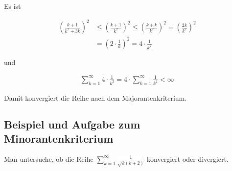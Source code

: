 \documentclass[fontsize=9pt,
               parskip=half-,
               DIV=14,
               listof=chapterentry,
               tocflat]{scrbook}
\begin{document}
\begin{solution*}[Majorantenkriterium]
Es ist

\begin{align*}
\left({\frac {k+1}{k^{2}+3k}}\right)^{2}&\leq \left({\frac {k+1}{k^{2}}}\right)^{2}\leq \left({\frac {k+k}{k^{2}}}\right)^{2}=\left({\frac {2k}{k^{2}}}\right)^{2}\\[0.5em]&=\left(2\cdot {\frac {1}{k}}\right)^{2}=4\cdot {\frac {1}{k^{2}}}
\end{align*}

und

\begin{align*}
\sum _{k=1}^{\infty }4\cdot {\frac {1}{k^{2}}}=4\cdot \sum _{k=1}^{\infty }{\frac {1}{k^{2}}}<\infty 
\end{align*}

Damit konvergiert die Reihe nach dem Majorantenkriterium.

\end{solution*}
\clearpage
\subsection{Beispiel und Aufgabe zum Minorantenkriterium}

\begin{exercise*}[Minorantenkriterium]
Man untersuche, ob die Reihe $\sum _{k=1}^{\infty }{\tfrac {1}{\sqrt {k(k+2)}}}$ konvergiert oder divergiert.

\end{exercise*}
\end{document}
